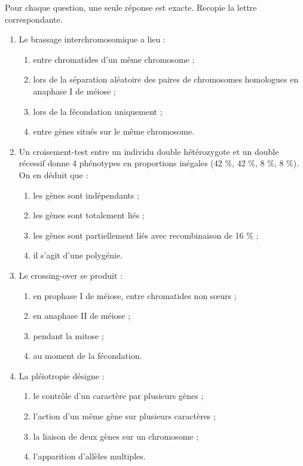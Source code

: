 \documentclass[11pt]{article}
\begin{document}
\begin{exercice}
Pour chaque question, une seule réponse est exacte. Recopie la lettre correspondante.
\begin{enumerate}
\item Le brassage interchromosomique a lieu :
\begin{enumerate}
\item entre chromatides d'un même chromosome ;
\item lors de la séparation aléatoire des paires de chromosomes homologues en anaphase I de méiose ;
\item lors de la fécondation uniquement ;
\item entre gènes situés sur le même chromosome.
\end{enumerate}
\item Un croisement-test entre un individu double hétérozygote et un double récessif donne 4 phénotypes en proportions inégales (42 \%, 42 \%, 8 \%, 8 \%). On en déduit que :
\begin{enumerate}
\item les gènes sont indépendants ;
\item les gènes sont totalement liés ;
\item les gènes sont partiellement liés avec recombinaison de 16 \% ;
\item il s'agit d'une polygénie.
\end{enumerate}
\item Le crossing-over se produit :
\begin{enumerate}
\item en prophase I de méiose, entre chromatides non sœurs ;
\item en anaphase II de méiose ;
\item pendant la mitose ;
\item au moment de la fécondation.
\end{enumerate}
\item La pléiotropie désigne :
\begin{enumerate}
\item le contrôle d'un caractère par plusieurs gènes ;
\item l'action d'un même gène sur plusieurs caractères ;
\item la liaison de deux gènes sur un chromosome ;
\item l'apparition d'allèles multiples.
\end{enumerate}
\end{enumerate}
\end{exercice}
\end{document}

